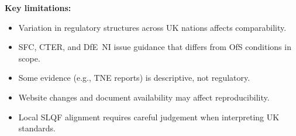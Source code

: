 \begin{tcolorbox}
\textbf{Key limitations:}
\begin{itemize}
    \item Variation in regulatory structures across UK nations affects comparability.
    \item SFC, CTER, and DfE~NI issue guidance that differs from OfS conditions in scope.
    \item Some evidence (e.g., TNE reports) is descriptive, not regulatory.
    \item Website changes and document availability may affect reproducibility.
    \item Local SLQF alignment requires careful judgement when interpreting UK standards.
\end{itemize}
\end{tcolorbox}
